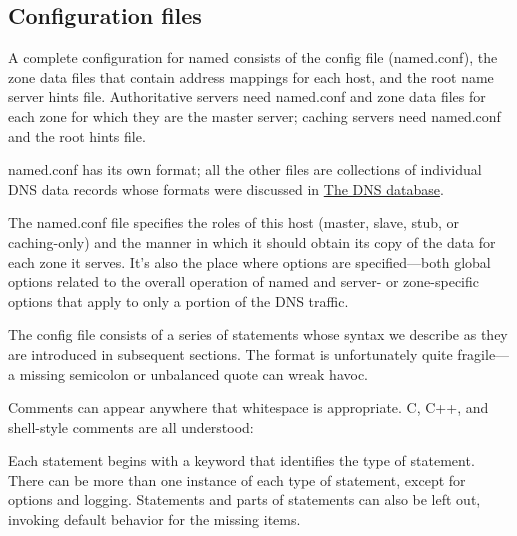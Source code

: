 \hypertarget{part0024_split_035.htmlux5cux23_idContainer1069}{}
\hypertarget{part0024_split_035.htmlux5cux23calibre_pb_34}{%
\subsection[Configuration
files]{\texorpdfstring{\protect\hypertarget{part0024_split_035.htmlux5cux23_idTextAnchor895}{}{}Configuration
files}{Configuration files}}\label{part0024_split_035.htmlux5cux23calibre_pb_34}}

A complete configuration for {named} consists of the config file
(\protect\hypertarget{part0024_split_035.htmlux5cux23_idIndexMarker2116}{}{}\protect\hypertarget{part0024_split_035.htmlux5cux23_idIndexMarker2117}{}{}\protect\hypertarget{part0024_split_035.htmlux5cux23_idIndexMarker2118}{}{}{named.conf}),
the zone data files that contain address mappings for each host, and the
root name server hints file. Authoritative servers need {named.conf} and
zone data files for each zone for which they are the master server;
caching servers need {named.conf} and the root hints file.

{named.conf} has its own format; all the other files are collections of
individual DNS data records whose formats were discussed in
\protect\hyperlink{part0024_split_019.htmlux5cux23_idTextAnchor865}{{The
DNS database}}.

The {named.conf} file specifies the roles of this host (master, slave,
stub, or caching-only) and the manner in which it should obtain its copy
of the data for each zone it serves. It's also the place where options
are specified---both global options related to the overall operation of
{named} and server- or zone-specific options that apply to only a
portion of the DNS traffic.

The config file consists of a series of statements whose syntax we
describe as they are introduced in subsequent sections. The format is
unfortunately quite fragile---a missing semicolon or unbalanced quote
can wreak havoc.

Comments can appear anywhere that whitespace is appropriate. C, C++, and
shell-style comments are all understood:


Each statement begins with a keyword that identifies the type of
statement. There can be more than one instance of each type of
statement, except for {options} and {logging}. Statements and parts of
statements can also be left out, invoking default behavior for the
missing items.

